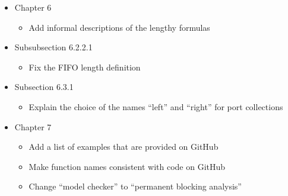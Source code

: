 \documentclass{article}
\begin{document}
\begin{itemize}
\begin{itemize}
        \end{itemize}
    \item Chapter 6
        \begin{itemize}
            \item Add informal descriptions of the lengthy formulas
        \end{itemize}
    \item Subsubsection 6.2.2.1
        \begin{itemize}
            \item Fix the FIFO length definition
        \end{itemize}
    \item Subsection 6.3.1
        \begin{itemize}
            \item Explain the choice of the names ``left'' and ``right'' for port collections
        \end{itemize}
    \item Chapter 7
        \begin{itemize}
            \item Add a list of examples that are provided on GitHub
            \item Make function names consistent with code on GitHub
            \item Change ``model checker'' to ``permanent blocking analysis''
        \end{itemize}
\end{itemize}
\end{document}
